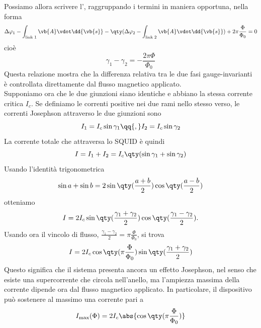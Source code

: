 Possiamo allora scrivere l', raggruppando i termini in maniera opportuna, nella forma
\begin{equation*}
    \Delta\varphi_1
    - \int_{\text{link }1} \vb{A}\vdot\dd{\vb{s}}
    - \qty( \Delta\varphi_2 - \int_{\text{link }2} \vb{A}\vdot\dd{\vb{s}}
    )
    + 2\pi\frac{\Phi}{\Phi_0}=0
\end{equation*}
cioè
\begin{equation*}
    \gamma_1 - \gamma_2=-\frac{2\pi\Phi}{\Phi_0}
\end{equation*}
Questa relazione mostra che la differenza relativa tra le due fasi gauge-invarianti è controllata direttamente dal flusso magnetico applicato.\\
Supponiamo ora che le due giunzioni siano identiche e abbiano la stessa corrente critica $I_c$. Se definiamo le correnti positive nei due rami nello stesso verso, le correnti Josephson attraverso le due giunzioni sono
\begin{equation*}
    I_1=I_c\sin\gamma_1
    \qq{,}
    I_2=I_c\sin\gamma_2
\end{equation*}
La corrente totale che attraversa lo SQUID è quindi
\begin{equation*}
    I
    =I_1+I_2
    =I_c\qty(\sin\gamma_1+\sin\gamma_2)
\end{equation*}
Usando l'identità trigonometrica
\begin{equation*}
    \sin a+\sin b
    =
    2\sin\qty(\frac{a+b}{2})
    \cos\qty(\frac{a-b}{2})
\end{equation*}
otteniamo
\begin{equation*}
    I
    =
    2I_c
    \sin\qty(\frac{\gamma_1+\gamma_2}{2})
    \cos\qty(\frac{\gamma_1-\gamma_2}{2}).
\end{equation*}
Usando ora il vincolo di flusso, $\frac{\gamma_1-\gamma_2}{2} = \pi\frac{\Phi}{\Phi_0}$, si trova
\begin{equation*}
    I
    =
    2I_c
    \cos\qty(\pi\frac{\Phi}{\Phi_0})
    \sin\qty(\frac{\gamma_1+\gamma_2}{2})
\end{equation*}
Questo significa che il sistema presenta ancora un effetto Josephson, nel senso che esiste una supercorrente che circola nell'anello, ma l'ampiezza massima della corrente dipende ora dal flusso magnetico applicato. In particolare, il dispositivo può sostenere al massimo una corrente pari a
\begin{equation*}
    I_{\max}(\Phi)
    =2I_c\abs{\cos\qty(\pi\frac{\Phi}{\Phi_0})}
\end{equation*}
